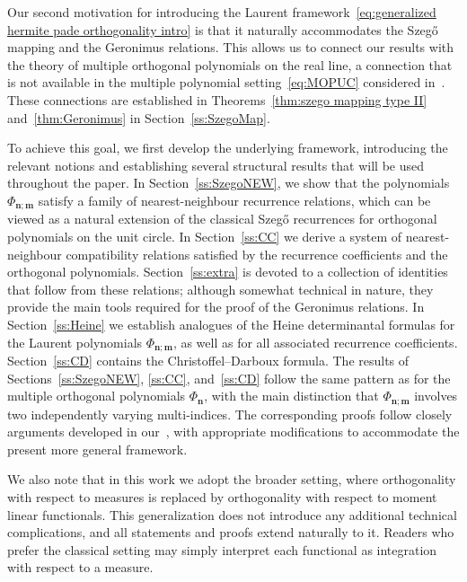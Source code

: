\documentclass[reqno,centertags,11pt,draft]{amsart}
\begin{document}
Our second motivation for introducing the Laurent framework~\eqref{eq:generalized hermite pade orthogonality intro} is that it naturally accommodates the Szeg\H{o} mapping and the Geronimus relations. This allows us to connect our results with the theory of multiple orthogonal polynomials on the real line, a connection that is not available in the multiple polynomial setting~\eqref{eq:MOPUC} considered in~\cite{MOPUC1,MOPUC2,KVMOPUC}. These connections are established in Theorems~\ref{thm:szego mapping type II} and~\ref{thm:Geronimus} in Section~\ref{ss:SzegoMap}.

To achieve this goal, we first develop the underlying framework, introducing the relevant notions and establishing several structural results that will be used throughout the paper. In Section~\ref{ss:SzegoNEW}, we show that the polynomials $\Phi_{\bm{n};\bm{m}}$ satisfy a family of nearest-neighbour recurrence relations, which can be viewed as a natural extension of the classical Szeg\H{o} recurrences for orthogonal polynomials on the unit circle. In Section~\ref{ss:CC} we derive a system of nearest-neighbour compatibility relations satisfied by the recurrence coefficients and the orthogonal polynomials. Section~\ref{ss:extra} is devoted to a collection of identities that follow from these relations; although somewhat technical in nature, they provide the main tools required for the proof of the Geronimus relations. In Section~\ref{ss:Heine} we establish analogues of the Heine determinantal formulas for the Laurent polynomials $\Phi_{\bm{n};\bm{m}}$, as well as for all associated recurrence coefficients. Section~\ref{ss:CD} contains the Christoffel--Darboux formula.
The results of Sections~\ref{ss:SzegoNEW}, \ref{ss:CC}, and~\ref{ss:CD} follow the same pattern as for the multiple orthogonal polynomials $\Phi_{\bm{n}}$, with the main distinction that $\Phi_{\bm{n};\bm{m}}$ involves two independently varying multi-indices. 
The corresponding proofs follow closely arguments developed in our~\cite{KVMOPUC}, with appropriate modifications to accommodate the present more general framework.


We also note that in this work we adopt the broader setting, where orthogonality with respect to measures is replaced by orthogonality with respect to moment linear functionals. This generalization does not introduce any additional technical complications, and all statements and proofs extend naturally to it.  Readers who prefer the classical setting may simply interpret each functional as integration with respect to a measure. 
\end{document}
